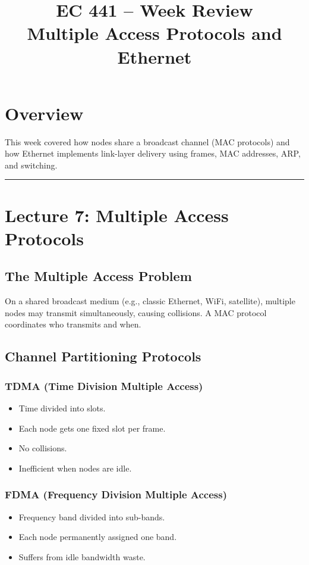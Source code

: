 \documentclass[11pt]{article}
\title{EC 441 -- Week Review \\ Multiple Access Protocols and Ethernet}
\date{}
\begin{document}
\maketitle

\section*{Overview}
This week covered how nodes share a broadcast channel (MAC protocols) and how Ethernet implements link-layer delivery using frames, MAC addresses, ARP, and switching.

\hrule
\vspace{0.5cm}

\section{Lecture 7: Multiple Access Protocols}

\subsection{The Multiple Access Problem}
On a shared broadcast medium (e.g., classic Ethernet, WiFi, satellite), multiple nodes may transmit simultaneously, causing collisions.  
A MAC protocol coordinates who transmits and when.

\subsection{Channel Partitioning Protocols}

\subsubsection*{TDMA (Time Division Multiple Access)}
\begin{itemize}
    \item Time divided into slots.
    \item Each node gets one fixed slot per frame.
    \item No collisions.
    \item Inefficient when nodes are idle.
\end{itemize}

\subsubsection*{FDMA (Frequency Division Multiple Access)}
\begin{itemize}
    \item Frequency band divided into sub-bands.
    \item Each node permanently assigned one band.
    \item Suffers from idle bandwidth waste.
\end{itemize}
\end{document}
